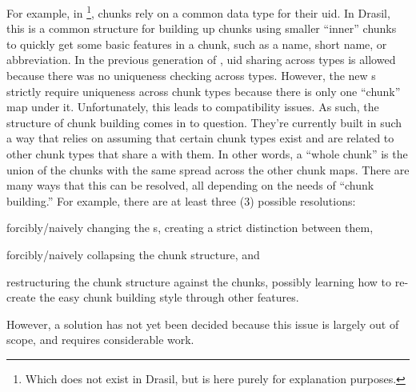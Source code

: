 For example, in \footnote{Which does not exist in
Drasil, but is here purely for explanation purposes.}, chunks rely on a common
data type for their \acs{uid}. In Drasil, this is a common structure for
building up chunks using smaller ``inner'' chunks to quickly get some basic
features in a chunk, such as a name, short name, or abbreviation. In the
previous generation of \ChunkDB{}, \acs{uid} sharing across types is allowed
because there was no \UID{} uniqueness checking across types. However, the new
\ChunkDB{}s strictly require \UID{} uniqueness across chunk types because there
is only one ``chunk'' map under it. Unfortunately, this leads to compatibility
issues. As such, the structure of chunk building comes in to question. They're
currently built in such a way that relies on assuming that certain chunk types
exist and are related to other chunk types that share a \UID{} with them. In
other words, a ``whole chunk'' is the union of the chunks with the same \UID{}
spread across the other chunk maps. There are many ways that this can be
resolved, all depending on the needs of ``chunk building.'' For example, there
are at least three (3) possible resolutions: 
\begin{inparaenum}[(i)]
      
      \item forcibly/naively changing the \UID{}s, creating a strict distinction
            between them, 

      \item forcibly/naively collapsing the chunk structure, and 
      
      \item restructuring the chunk structure against the chunks, possibly
            learning how to re-create the easy chunk building style through
            other features.

\end{inparaenum}
However, a solution has not yet been decided because this issue is largely out
of scope, and requires considerable work. 
